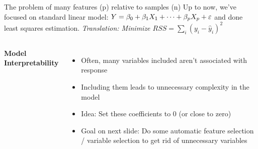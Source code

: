 \documentclass[aspectratio=169,usenames,dvipsnames]{beamer}
\newcommand{\InstructorNotes}[1]{\textit{\color{orange}#1}}
\newcommand{\InstructorList}[1]{
\begin{itemize}
	\color{orange}
	#1
\end{itemize}
}
\begin{document}
\begin{frame}[t]{The problem of many features (p) relative to samples (n)}
	Up to now, we've focused on standard linear model:
		$Y = \beta_0 + \beta_1 X_1 + \cdots + \beta_p X_p + \varepsilon$
	and done least squares estimation.
	\InstructorNotes{Translation: Minimize $RSS = \sum_{i}(y_i-\hat y_i)^2$}
\begin{columns}
	\centering


\textbf{Model Interpretability}
\footnotesize
\InstructorList{
\item Often, many variables included aren't associated with response
\item Including them leads to unnecessary complexity in the model
\item Idea: Set these coefficients to 0 (or close to zero)
\item Goal on next slide: Do some automatic feature selection / variable selection to get rid of unnecessary variables
}
\centering
\end{columns}

\end{frame}





\end{document}
